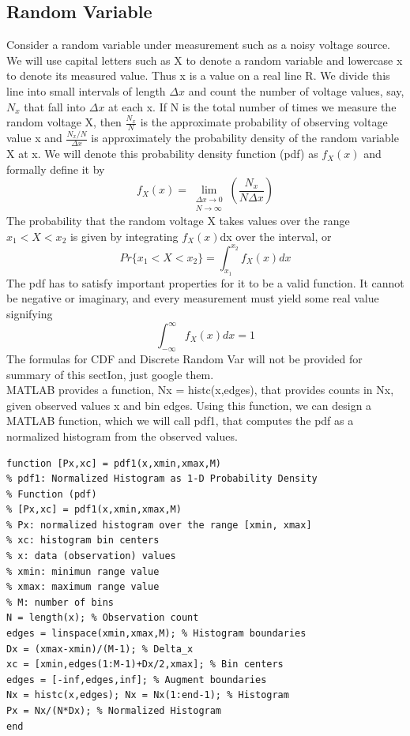 \documentclass{article}
\begin{document}
\subsection{Random Variable}
Consider a random variable under measurement such as a noisy voltage
source. We will use capital letters such as X to denote a random variable
and lowercase x to denote its measured value. Thus x is a value on a real
line R. We divide this line into small intervals of length $\Delta x$ and count the
number of voltage values, say, $N_x$ that fall into $\Delta x$ at each x. If N is the
total number of times we measure the random voltage X, then $\frac{N_x}{N}$ is
the approximate probability of observing voltage value x and $\frac{N_x/N}{\Delta x}$
is approximately the probability density of the random variable X at x. We
will denote this probability density function (pdf) as $f_X(x)$ and formally
define it by
\begin{equation}
f_X(x) = \lim_{\substack{\Delta x \to 0 \\ N \to \infty}} \left( \frac{N_x}{N \Delta x} \right)
\end{equation}
The probability that the random voltage X takes values over the range $x_1 < X < x_2$ is given by integrating $f_X(x)$dx over the interval, or 
\begin{equation}
Pr\{x_1 < X < x_2 \} = \int_{x_1}^{x_2}f_X(x)dx
\end{equation}
The pdf has to satisfy important properties for it to be a valid function.
It cannot be negative or imaginary, and every measurement must yield
some real value signifying
\begin{equation}
\int_{-\infty}^{\infty}f_X(x)dx=1
\end{equation}
The formulas for CDF and Discrete Random Var will not be provided for summary of this sectIon, just google them. \\
\vspace{1em}
MATLAB provides a function, Nx =
histc(x,edges), that provides counts in Nx, given observed values x and
bin edges. Using this function, we can design a MATLAB function, which
we will call pdf1, that computes the pdf as a normalized histogram from
the observed values.
\begin{lstlisting}
function [Px,xc] = pdf1(x,xmin,xmax,M)
% pdf1: Normalized Histogram as 1-D Probability Density
% Function (pdf)
% [Px,xc] = pdf1(x,xmin,xmax,M)
% Px: normalized histogram over the range [xmin, xmax]
% xc: histogram bin centers
% x: data (observation) values
% xmin: minimun range value
% xmax: maximum range value
% M: number of bins
N = length(x); % Observation count
edges = linspace(xmin,xmax,M); % Histogram boundaries
Dx = (xmax-xmin)/(M-1); % Delta_x
xc = [xmin,edges(1:M-1)+Dx/2,xmax]; % Bin centers
edges = [-inf,edges,inf]; % Augment boundaries
Nx = histc(x,edges); Nx = Nx(1:end-1); % Histogram
Px = Nx/(N*Dx); % Normalized Histogram
end
\end{lstlisting}
\end{document}
